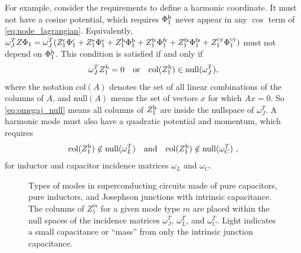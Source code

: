For example, consider the requirements to define a harmonic coordinate. It must not have a cosine potential, which requires $\Phi_1^{\rm h}$ never appear in any $\cos$ term of \cref{eq:node_lagrangian}. Equivalently, $\omega_{J}^TZ\Phi_1 = \omega_{J}^T(
       Z_1^{\rm c}\Phi_1^{\rm c} +Z_1^{\rm e}\Phi_1^{\rm e} + Z_1^{\rm h}\Phi_1^{\rm h} + Z_1^{\rm fr}\Phi_1^{\rm fr} + Z_1^{\rm fz}\Phi_1^{\rm fz} + Z_1^{\rm cy}\Phi_1^{\rm cy}
    )$
must not depend on $\Phi_1^{\rm h}$. This condition is satisfied if and only if
\begin{align}\label{eq:omegaj_null}
    \omega_J^TZ_1^{\rm h} = 0 \quad \textrm{or} \quad \textrm{col}(Z_1^{\rm h}) \in \textrm{null}(\omega_J^T),
\end{align}
where the notation $\textrm{col}(A)$ denotes the set of all linear combinations of the columns of $A$, and $\textrm{null}(A)$ means the set of vectors $x$ for which $Ax=0$.
So \cref{eq:omegaj_null} means all columns of $Z_1^{\rm h}$ are inside the nullspace of $\omega_J^T$. A harmonic mode must also have a quadratic potential and momentum, which requires
\begin{align}
    \textrm{col}(Z_1^{\rm h}) \notin \textrm{null}(\omega_L^T) \quad \textrm{and} \quad \textrm{col}(Z_1^{\rm h}) \notin \textrm{null}(\omega_C^T)~,
\end{align}
for inductor and capacitor incidence matrices $\omega_L$ and $\omega_C$.

\begin{figure}[htbp]
\centering
\resizebox{0.85\columnwidth}{!}{}
\caption{Types of modes in superconducting circuits made of pure capacitors, pure inductors, and Josephson junctions with intrinsic capacitance. The columns of $Z_1^{m}$ for a given mode type $m$ are placed within the null spaces of the incidence matrices $\omega_J^T$, $\omega_L^T$, and $\omega_C^T$. Light indicates a small capacitance or ``mass'' from only the intrinsic junction capacitance.}\label{fig:mode_diagram}
\end{figure}

